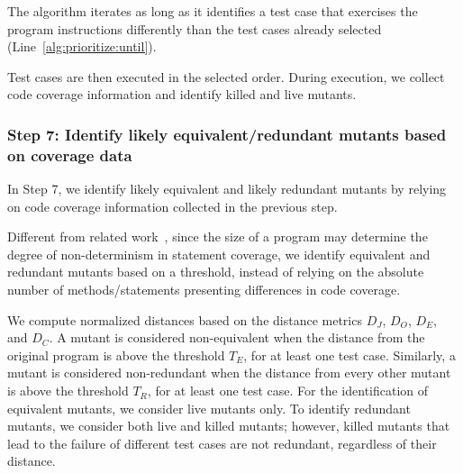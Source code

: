 The algorithm iterates as long as it identifies a test case that exercises 
the program instructions differently than the test cases already selected (Line~\ref{alg:prioritize:until}).

Test cases are then executed in the selected order. During  execution, we collect code coverage information and identify killed and live mutants.



\subsubsection{Step 7: Identify likely equivalent/redundant mutants based on coverage data}
\label{sec:algostepSeven}


In Step 7, we identify likely equivalent and likely redundant mutants by relying on code coverage information  {collected in the previous step}.

Different from related work~\cite{schuler2013covering}, since the size of a program may determine the degree of non-determinism in statement coverage, 
we identify equivalent and redundant mutants based on a threshold, instead of relying on the absolute number of methods/statements presenting differences in code coverage. 

We compute normalized distances based on the distance metrics $D_J$, $D_O$, $D_E$, and $D_C$. A mutant is considered non-equivalent when the distance from the original program is above the threshold $T_E$, for at least one test case.
Similarly, a mutant is considered non-redundant when the distance from every other mutant is above the threshold $T_R$, for at least one test case. For the identification of equivalent mutants, we consider live mutants only. To identify redundant mutants, we consider both live and killed mutants; however, killed mutants that lead to the failure of different test cases are not redundant, regardless of their distance.


